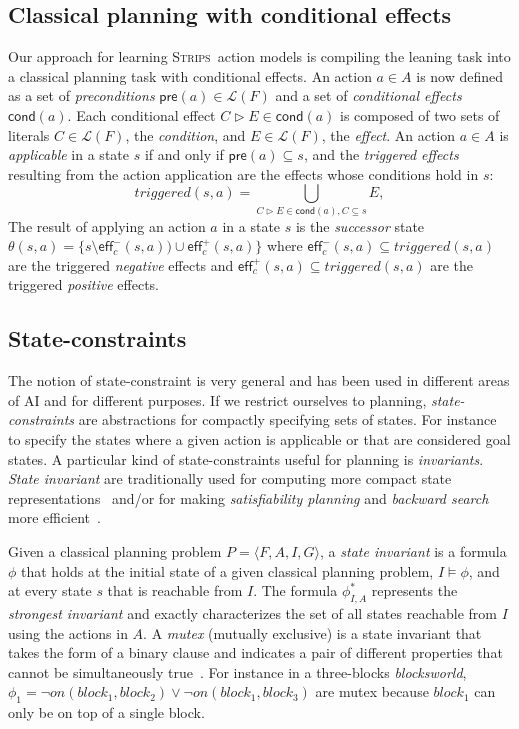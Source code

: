 \documentclass{article}
\newcommand{\tup}[1]{{\langle #1 \rangle}}
\newcommand{\pre}{\mathsf{pre}}     %
\newcommand{\eff}{\mathsf{eff}}     %
\newcommand{\cond}{\mathsf{cond}}   %
\newcommand{\strips}{\textsc{Strips}}     %
\begin{document}
\subsection{Classical planning with conditional effects}
Our approach for learning \strips\ action models is compiling the leaning task into a classical planning task with conditional effects. An action $a\in A$ is now defined as a set of {\em preconditions} $\pre(a)\in\mathcal{L}(F)$ and a set of {\em conditional effects} $\cond(a)$. Each conditional effect $C\rhd E\in\cond(a)$ is composed of two sets of literals $C\in\mathcal{L}(F)$, the {\em condition}, and $E\in\mathcal{L}(F)$, the {\em effect}. An action $a\in A$ is {\em applicable} in a state $s$ if and only if $\pre(a)\subseteq s$, and the {\em triggered effects} resulting from the action application are the effects whose conditions hold in $s$:
\[
triggered(s,a)=\bigcup_{C\rhd E\in\cond(a),C\subseteq s} E,
\]
The result of applying an action $a$ in a state $s$ is the {\em successor} state $\theta(s,a)=\{s\setminus\eff_c^-(s,a))\cup\eff_c^+(s,a)\}$ where $\eff_c^-(s,a)\subseteq triggered(s,a)$ are the triggered {\em negative} effects and $\eff_c^+(s,a)\subseteq triggered(s,a)$ are the triggered {\em positive} effects.


\subsection{State-constraints}
The notion of state-constraint is very general and has been used in different areas of AI and for different purposes.  If we restrict ourselves to planning, {\em state-constraints} are abstractions for compactly specifying sets of states. For instance to specify the states where a given action is applicable or that are considered goal states.  A particular kind of state-constraints useful for planning is {\em invariants}. {\em State invariant} are traditionally used for computing more compact state representations~\cite{helmert2009concise} and/or for making {\em satisfiability planning} and {\em backward search} more efficient~\cite{rintanen2014madagascar,alcazar2015reminder}.

Given a classical planning problem $P=\tup{F,A,I,G}$, a {\em state invariant} is a formula $\phi$ that holds at the initial state of a given classical planning problem, $I\models \phi$, and at every state $s$ that is reachable from $I$. The formula $\phi_{I,A}^*$ represents the {\em strongest invariant} and exactly characterizes the set of all states reachable from $I$ using the actions in $A$. A {\em mutex} (mutually exclusive) is a state invariant that takes the form of a binary clause and indicates a pair of different properties that cannot be simultaneously true~\cite{kautz:mutex:IJCAI1999}. For instance in a three-blocks {\em blocksworld}, $\phi_1=\neg on(block_1,block_2)\vee \neg on(block_1,block_3)$ are mutex because $block_1$ can only be on top of a single block. 
\end{document}
